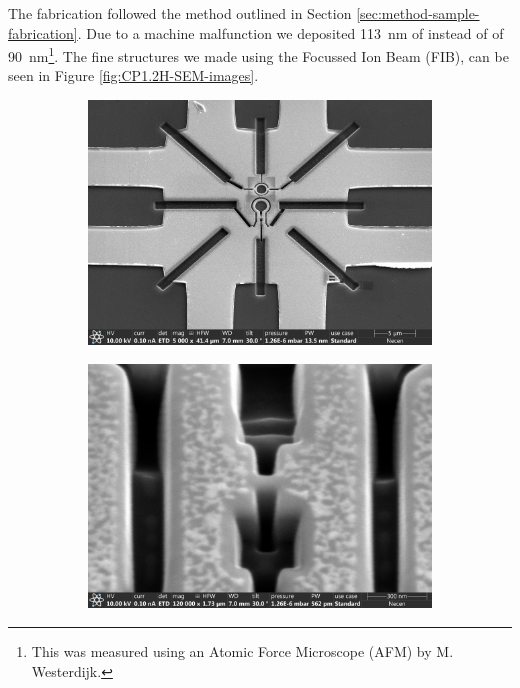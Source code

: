 The fabrication followed the method outlined in Section \ref{sec:method-sample-fabrication}. Due to a machine malfunction we deposited \qty{113}{\nano\meter} of  instead of of \qty{90}{\nano\meter}\footnote{This was measured using an Atomic Force Microscope (AFM) by M. Westerdijk.}. The fine structures we made using the Focussed Ion Beam (FIB), can be seen in Figure \ref{fig:CP1.2H-SEM-images}.

\begin{figure}[ht]
	\begin{subfigure}[t]{0.3\textwidth}
		\centering
		\includegraphics[width=\textwidth]{figures/samples/CP1/CP1.2H_SEM_overview.jpg}
	\end{subfigure}
	\hfill
	\begin{subfigure}[t]{0.3\textwidth}
		\centering
		\includegraphics[width=\textwidth]{figures/samples/CP1/CP1.2H_SEM_junction.jpg}

\end{subfigure}
\end{figure}
